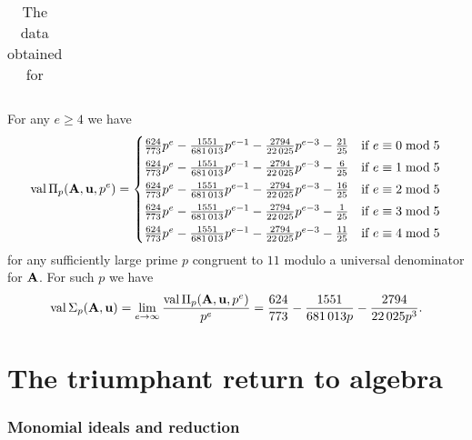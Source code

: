 \documentclass{article}
\begin{document}
\begin{example}
\begin{table}
\begin{center}
\begin{tabular}{cccc}
         \end{tabular}
         \endgroup
      \end{center}
      \caption{The data obtained for }
      \label{table: new example data}
   \end{table}
   For any $e\ge 4$ we have
   \[
      \operatorname{val}\Pi_p(\mathbf{A},\mathbf{u},p^e) =
      \begin{cases}
         \frac{624}{773}p^{e} - \frac{\num{1551}}{\num{681013}}p^{e-1} - \frac{\num{2794}}{\num{22025}}p^{e-3} - \frac{21}{25} & \text{if $e \equiv 0 \bmod 5$}\\[1mm]
         \frac{624}{773}p^{e} - \frac{\num{1551}}{\num{681013}}p^{e-1} - \frac{\num{2794}}{\num{22025}}p^{e-3} - \frac{6}{25} & \text{if $e \equiv 1 \bmod 5$}\\[1mm]
         \frac{624}{773}p^{e} - \frac{\num{1551}}{\num{681013}}p^{e-1} - \frac{\num{2794}}{\num{22025}}p^{e-3} - \frac{16}{25} & \text{if $e \equiv 2 \bmod 5$}\\[1mm]
         \frac{624}{773}p^{e} - \frac{\num{1551}}{\num{681013}}p^{e-1} - \frac{\num{2794}}{\num{22025}}p^{e-3} - \frac{1}{25} & \text{if $e \equiv 3 \bmod 5$}\\[1mm]
         \frac{624}{773}p^{e} - \frac{\num{1551}}{\num{681013}}p^{e-1} - \frac{\num{2794}}{\num{22025}}p^{e-3} - \frac{11}{25} & \text{if $e \equiv 4 \bmod 5$}
      \end{cases}
   \]
   for any sufficiently large prime $p$ congruent to $11$ modulo a universal denominator for $\mathbf{A}$.
   For such $p$ we have
   \[\operatorname{val} \Sigma_p(\mathbf{A},\mathbf{u}) = \lim_{e\to \infty}  \frac{\operatorname{val}\Pi_p(\mathbf{A},\mathbf{u},p^e)}{p^e}  = \frac{624}{773} - \frac{\num{1551}}{\num{681013} p} - \frac{\num{2794}}{\num{22025} p^3}.\]
\end{example}

\newpage

\part{The triumphant return to algebra}

\section{Monomial ideals and reduction}
\label{monomial-reduction: A}
\end{document}
